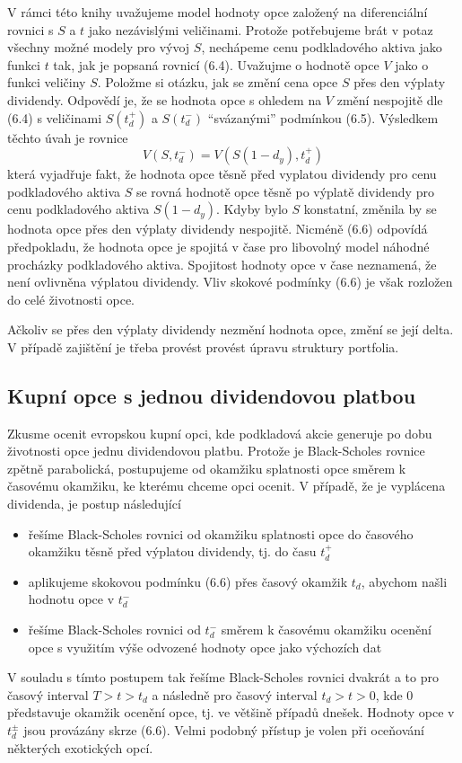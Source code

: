 \documentclass[a4paper]{book}
\begin{document}
V rámci této knihy uvažujeme model hodnoty opce založený na diferenciální rovnici s $S$ a $t$ jako nezávislými veličinami. Protože potřebujeme brát v potaz všechny možné modely pro vývoj $S$, nechápeme cenu podkladového aktiva jako funkci $t$ tak, jak je popsaná rovnicí (6.4). Uvažujme o hodnotě opce $V$ jako o funkci veličiny $S$. Položme si otázku, jak se změní cena opce $S$ přes den výplaty dividendy. Odpovědí je, že se hodnota opce s ohledem na $V$ změní nespojitě dle (6.4) s veličinami $S(t_d^+)$ a $S(t_d^-)$ ``svázanými'' podmínkou (6.5). Výsledkem těchto úvah je rovnice
\begin{equation}
V(S,t_d^-) = V(S(1-d_y),t_d^+)
\end{equation}
která vyjadřuje fakt, že hodnota opce těsně před vyplatou dividendy pro cenu podkladového aktiva $S$ se rovná hodnotě opce těsně po výplatě dividendy pro cenu podkladového aktiva $S(1 - d_y)$. Kdyby bylo $S$ konstatní, změnila by se hodnota opce přes den výplaty dividendy nespojitě. Nicméně (6.6) odpovídá předpokladu, že hodnota opce je spojitá v čase pro libovolný model náhodné procházky podkladového aktiva. Spojitost hodnoty opce v čase neznamená, že není ovlivněna výplatou dividendy. Vliv skokové podmínky (6.6) je však rozložen do celé životnosti opce.

Ačkoliv se přes den výplaty dividendy nezmění hodnota opce, změní se její delta. V případě zajištění je třeba provést provést úpravu struktury portfolia.

\subsection{Kupní opce s jednou dividendovou platbou}

Zkusme ocenit evropskou kupní opci, kde podkladová akcie generuje po dobu životnosti opce jednu dividendovou platbu. Protože je Black-Scholes rovnice zpětně parabolická, postupujeme od okamžiku splatnosti opce směrem k časovému okamžiku, ke kterému chceme opci ocenit. V případě, že je vyplácena dividenda, je postup následující
\begin{itemize}
\item řešíme Black-Scholes rovnici od okamžiku splatnosti opce do časového okamžiku těsně před výplatou dividendy, tj. do času $t_d^+$
\item aplikujeme skokovou podmínku (6.6) přes časový okamžik $t_d$, abychom našli hodnotu opce v $t_d^-$
\item řešíme Black-Scholes rovnici od $t_d^-$ směrem k časovému okamžiku ocenění opce s využitím výše odvozené hodnoty opce jako výchozích dat
\end{itemize}
V souladu s tímto postupem tak řešíme Black-Scholes rovnici dvakrát a to pro časový interval $T > t > t_d$ a následně pro časový interval $t_d > t > 0$, kde 0 představuje okamžik ocenění opce, tj. ve většině případů dnešek. Hodnoty opce v $t_d^{\pm}$ jsou provázány skrze (6.6). Velmi podobný přístup je volen při oceňování některých exotických opcí.
\end{document}
